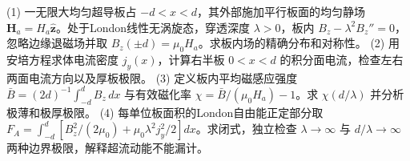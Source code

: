 (1) 一无限大均匀超导板占 \(-d<x<d\)，其外部施加平行板面的均匀静场 \(\mathbf H_a=H_a\hat{\mathbf z}\)。处于London线性无涡旋态，穿透深度 \(\lambda>0\)，板内 \(B_z-\lambda^2 B_z''=0\)，忽略边缘退磁场并取 \(B_z(\pm d)=\mu_0H_a\)。求板内场的精确分布和对称性。
(2) 用安培方程求体电流密度 \(j_y(x)\)，计算右半板 \(0<x<d\) 的积分面电流，检查左右两面电流方向以及厚板极限。
(3) 定义板内平均磁感应强度 \(\bar B=(2d)^{-1}\int_{-d}^d B_z\,dx\) 与有效磁化率 \(\chi=\bar B/(\mu_0H_a)-1\)。求 \(\chi(d/\lambda)\) 并分析极薄和极厚极限。
(4) 每单位板面积的London自由能正定部分取 \(F_A=\int_{-d}^d[B_z^2/(2\mu_0)+\mu_0\lambda^2j_y^2/2]dx\)。求闭式，独立检查 \(\lambda\to\infty\) 与 \(d/\lambda\to\infty\) 两种边界极限，解释超流动能不能漏计。
